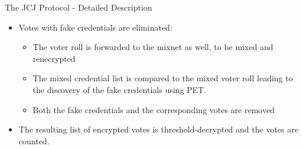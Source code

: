 \documentclass{beamer}
\begin{document}
\begin{frame}{The JCJ Protocol - Detailed Description}
\begin{enumerate}
\begin{itemize}
\begin{itemize}
\item Two lists are created, from the rest of the valid ballots $L$. 
\item $L_1$ contains the encrypted votes 
\item $L_2$ contains the encrypted credentials.
\item Duplicates are removed from $L_2$ using PET (each encryption in $L_2$ is compared to all others in $L_2$)
\item The removal is cascaded to the list with the encrypted votes using a \textit{first vote counts} or \textit{last vote counts} rule.
\item The lists are merged. The result $L'$ contains distinct items and is forwarded to a mixnet. 
\end{itemize}

\framebreak 

\item Votes with fake credentials are eliminated:
\begin{itemize}
\item The voter roll is forwarded to the mixnet as well, to be mixed and renecrypted
\item The mixed credential list is compared to the mixed voter roll leading to the discovery of the fake credentials using PET.
\item Both the fake credentials and the corresponding votes are removed
\end{itemize}
\item The resulting list of encrypted votes is threshold-decrypted and the votes are counted. 
\end{itemize}
\end{enumerate}

\end{frame}
\end{document}
